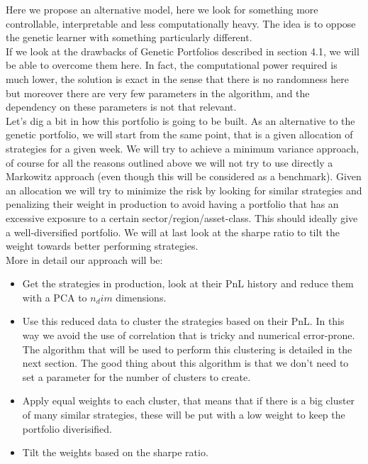 Here we propose an alternative model, here we look for something more controllable, interpretable and less computationally heavy. The idea is to oppose the genetic learner with something particularly different.\\
If we look at the drawbacks of Genetic Portfolios described in section 4.1, we will be able to overcome them here. In fact, the computational power required is much lower, the solution is exact in the sense that there is no randomness here but moreover there are very few parameters in the algorithm, and the dependency on these parameters is not that relevant.\\
Let's dig a bit in how this portfolio is going to be built. As an alternative to the genetic portfolio, we will start from the same point, that is a given allocation of strategies for a given week. We will try to achieve a minimum variance approach, of course for all the reasons outlined above we will not try to use directly a Markowitz approach (even though this will be considered as a benchmark). Given an allocation we will try to minimize the risk by looking for similar strategies and penalizing their weight in production to avoid having a portfolio that has an excessive exposure to a certain sector/region/asset-class. This should ideally give a well-diversified portfolio. We will at last look at the sharpe ratio to tilt the weight towards better performing strategies.\\
More in detail our approach will be:

\begin{itemize}
	\item Get the strategies in production, look at their PnL history and reduce them with a PCA to $n_dim$ dimensions.
	\item Use this reduced data to cluster the strategies based on their PnL. In this way we avoid the use of correlation that is tricky and numerical error-prone. The algorithm that will be used to perform this clustering is detailed in the next section. The good thing about this algorithm is that we don't need to set a parameter for the number of clusters to create.
	\item Apply equal weights to each cluster, that means that if there is a big cluster of many similar strategies, these will be put with a low weight to keep the portfolio diverisified.
	\item Tilt the weights based on the sharpe ratio.
\end{itemize}